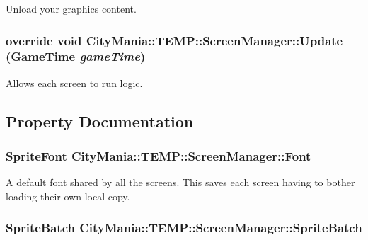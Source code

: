 Unload your graphics content. \hypertarget{classCityMania_1_1TEMP_1_1ScreenManager_a29bb9d9173fc172bb748520434bb9956}{
\subsubsection[{Update}]{\setlength{\rightskip}{0pt plus 5cm}override void CityMania::TEMP::ScreenManager::Update (GameTime {\em gameTime})}}
\label{classCityMania_1_1TEMP_1_1ScreenManager_a29bb9d9173fc172bb748520434bb9956}


Allows each screen to run logic. 

\subsection{Property Documentation}
\hypertarget{classCityMania_1_1TEMP_1_1ScreenManager_a50897fc0fe5df9097d558c2e94f5adb7}{
\subsubsection[{Font}]{\setlength{\rightskip}{0pt plus 5cm}SpriteFont CityMania::TEMP::ScreenManager::Font}}
\label{classCityMania_1_1TEMP_1_1ScreenManager_a50897fc0fe5df9097d558c2e94f5adb7}


A default font shared by all the screens. This saves each screen having to bother loading their own local copy. \hypertarget{classCityMania_1_1TEMP_1_1ScreenManager_a89dc251770c88ab602b89b7d30d5da69}{
\subsubsection[{SpriteBatch}]{\setlength{\rightskip}{0pt plus 5cm}SpriteBatch CityMania::TEMP::ScreenManager::SpriteBatch}}
\label{classCityMania_1_1TEMP_1_1ScreenManager_a89dc251770c88ab602b89b7d30d5da69}


